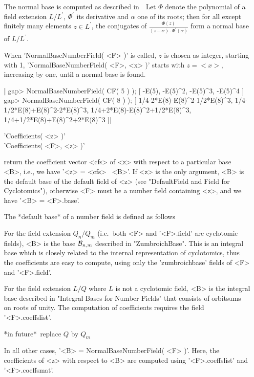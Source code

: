 The normal base is computed as described in~\cite{Art68}\:\ 
Let $\Phi$ denote the polynomial of a field extension $L/L^{\prime}$,
$\Phi^{\prime}$ its derivative and $\alpha$ one of its roots;
then for all except finitely many elements $z\in L^{\prime}$, the
conjugates of $\frac{\Phi(z)}{(z-\alpha)\cdot\Phi^{\prime}(\alpha)}$
form a normal base of $L/L^{\prime}$.

When 'NormalBaseNumberField( <F> )' is called, $z$ is chosen as integer,
starting with 1, 'NormalBaseNumberField( <F>, <x> )' starts with $z=<x>$,
increasing by one, until a normal base is found.

|    gap> NormalBaseNumberField( CF( 5 ) );
    [ -E(5), -E(5)^2, -E(5)^3, -E(5)^4 ]
    gap> NormalBaseNumberField( CF( 8 ) );
    [ 1/4-2*E(8)-E(8)^2-1/2*E(8)^3, 1/4-1/2*E(8)+E(8)^2-2*E(8)^3, 
      1/4+2*E(8)-E(8)^2+1/2*E(8)^3, 1/4+1/2*E(8)+E(8)^2+2*E(8)^3 ]|

\Section{Coefficients for Number Fields}

'Coefficients( <z> )'\\
'Coefficients( <F>, <z> )'

return the coefficient vector <cfs> of <z> with respect to a particular
base <B>, i.e., we have '<z> = <cfs> \*\ <B>'.  If <z> is the only
argument, <B> is the default base of the default field of <z>
(see "DefaultField and Field for Cyclotomics"), otherwise <F> must be a
number field containing <z>, and we have '<B> = <F>.base'.

The *default base* of a number field is defined as follows\:

For the field extension $Q_n/Q_m$ (i.e.\ both <F> and '<F>.field' are
cyclotomic fields), <B> is the base ${\cal{B}}_{n,m}$ described in
"ZumbroichBase".  This is an integral base which is closely related to
the internal representation of cyclotomics, thus the coefficients are
easy to compute, using only the 'zumbroichbase' fields of <F> and
'<F>.field'.

For the field extension $L/Q$ where $L$ is not a cyclotomic field, <B> is
the integral base described in "Integral Bases for Number Fields" that
consists of orbitsums on roots of unity.  The computation of coefficients
requires the field '<F>.coeffslist'.

*in future*\:\ replace $Q$ by $Q_m$

In all other cases, '<B> = NormalBaseNumberField( <F> )'.  Here, the
coefficients of <z> with respect to <B> are computed using
'<F>.coeffslist' and '<F>.coeffsmat'.

